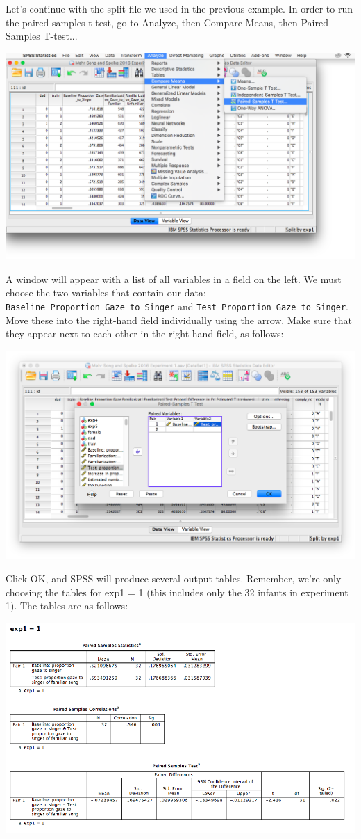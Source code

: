 \documentclass[
]{book}
\begin{document}
Let's continue with the split file we used in the previous example. In order to run the paired-samples t-test, go to {Analyze}, then {Compare Means}, then {Paired-Samples T-test..}.

\includegraphics{img/6.4.17.png}

A window will appear with a list of all variables in a field on the left. We must choose the two variables that contain our data: \texttt{Baseline\_Proportion\_Gaze\_to\_Singer} and \texttt{Test\_Proportion\_Gaze\_to\_Singer}. Move these into the right-hand field individually using the arrow. Make sure that they appear next to each other in the right-hand field, as follows:

\includegraphics{img/6.4.18.png}

Click {OK}, and SPSS will produce several output tables. Remember, we're only choosing the tables for exp1 = 1 (this includes only the 32 infants in experiment 1). The tables are as follows:

\includegraphics{img/6.4.19.png}
\end{document}
